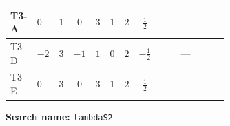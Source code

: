 \documentclass[8pt]{article}
\begin{document}
\begin{landscape}
\begin{longtable}{@{}llcccccc >{\raggedright\arraybackslash}p{0.21\linewidth} >{\raggedright\arraybackslash}p{0.21\linewidth} >{\raggedright\arraybackslash}p{0.21\linewidth}@{}}
\midrule
T3-A & $0$ & $1$ & $0$ & $3$ & $1$ & $2$ & $\frac{1}{2}$ & \scriptsize\adjustbox{max width=\linewidth}{$\begin{gathered} +4 {\lambda_{H2}}^2\end{gathered}$} & --- & \scriptsize\adjustbox{max width=\linewidth}{$\begin{gathered} +14 {\lambda_{S_2}}^2\end{gathered}$} \\
\midrule
T3-D & $-2$ & $3$ & $-1$ & $1$ & $0$ & $2$ & $-\frac{1}{2}$ & \scriptsize\adjustbox{max width=\linewidth}{$\begin{gathered} +4 {\lambda_{H2}}^2\end{gathered}$} & --- & \scriptsize\adjustbox{max width=\linewidth}{$\begin{gathered} +10 {\lambda_{S_2}}^2\end{gathered}$} \\
\midrule
T3-E & $0$ & $3$ & $0$ & $3$ & $1$ & $2$ & $\frac{1}{2}$ & \scriptsize\adjustbox{max width=\linewidth}{$\begin{gathered} +4 {\lambda_{H2}}^2\end{gathered}$} & --- & \scriptsize\adjustbox{max width=\linewidth}{$\begin{gathered} +14 {\lambda_{S_2}}^2\end{gathered}$} \\
\midrule
\bottomrule
\end{longtable}
\clearpage
\noindent\textbf{Search name: }\texttt{lambdaS2}\par\smallskip

\end{landscape}
\end{document}
